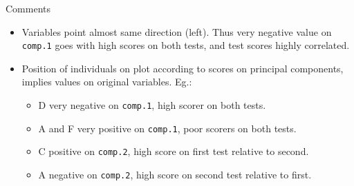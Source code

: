 \begin{frame}[fragile]{Comments}
  
  \begin{itemize}
  \item Variables point almost same direction (left). Thus very
    negative value on \texttt{comp.1} goes with high scores on both
    tests, and test scores highly correlated.
  \item Position of individuals on plot according to scores on
    principal components, implies values on original variables. Eg.:
    \begin{itemize}
    \item D very negative on \texttt{comp.1}, high scorer on both tests.
    \item A and F very positive on \texttt{comp.1}, poor scorers on
      both tests.
    \item C positive on \texttt{comp.2}, high score on first
      test relative to second.
    \item A negative on \texttt{comp.2}, high score on second test
      relative to first.
    \end{itemize}
  \end{itemize}
  
\end{frame}


